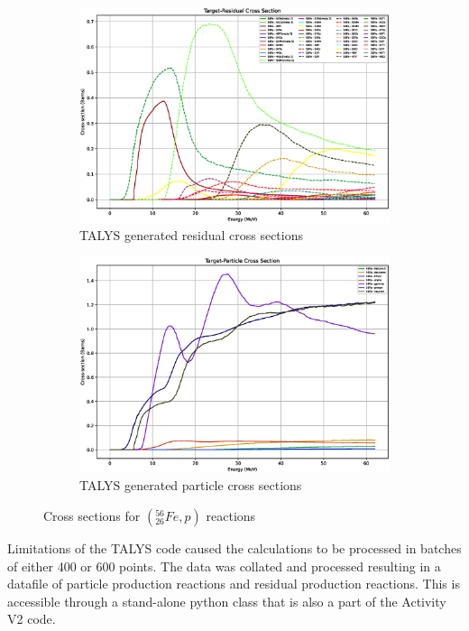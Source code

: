 \begin{figure}[htb]
\begin{subfigure}{0.49\textwidth}
  \includegraphics[width=\linewidth]{chapters/activity_code/tendl-fe56/rxs_p_26056_all.eps}
  \caption{TALYS generated residual cross sections}
  \label{fig:xsdata-residual}
\end{subfigure}\hfil %
\begin{subfigure}{0.49\textwidth}
  \includegraphics[width=\linewidth]{chapters/activity_code/tendl-fe56/pxs_p_26056_all.eps}
  \caption{TALYS generated particle cross sections}
  \label{fig:activity-v2-residual-6}
\end{subfigure}
\caption{Cross sections for $({}^{56}_{26}Fe, p)$ reactions}
\label{fig:xsdata-particle}
\end{figure}


Limitations of the TALYS code caused the calculations to be processed in batches of either 400 or 600 points.  The data was collated and processed resulting in a datafile of particle production reactions and residual production reactions.  This is accessible through a stand-alone python class that is also a part of the Activity V2 code.

